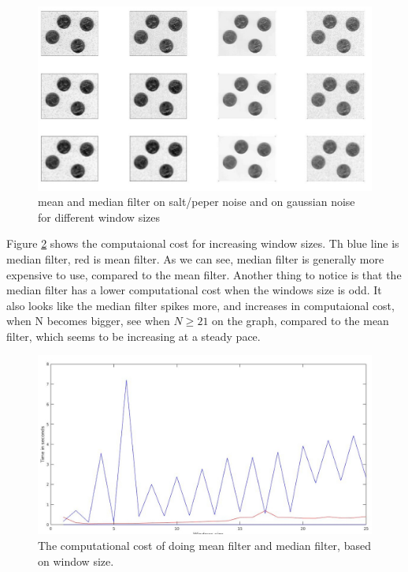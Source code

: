 \documentclass[11pt]{report}
\begin{document}
\begin{figure}[!ht]
    \centering
    \includegraphics[width=1\textwidth]{fig23_0.jpg}
    \caption{mean and median filter on salt/peper noise and on gaussian noise for different window sizes}
    \label{fig:2_3_0}
\end{figure}

Figure \ref{fig:2_3} shows the computaional cost for increasing window sizes. Th blue line is median filter, red is mean filter. As we can see, median filter is generally more expensive to use, compared to the mean filter. Another thing to notice is that the median filter has a lower computational cost when the windows size is odd. It also looks like the median filter spikes more, and increases in computaional cost, when N becomes bigger, see when $N \geq 21$ on the graph, compared to the mean filter, which seems to be increasing at a steady pace.

\begin{figure}[!ht]
    \centering
    \includegraphics[width=1\textwidth]{fig23.jpg}
    \caption{The computational cost of doing mean filter and median filter, based on window size.}
    \label{fig:2_3}
\end{figure}
\end{document}
